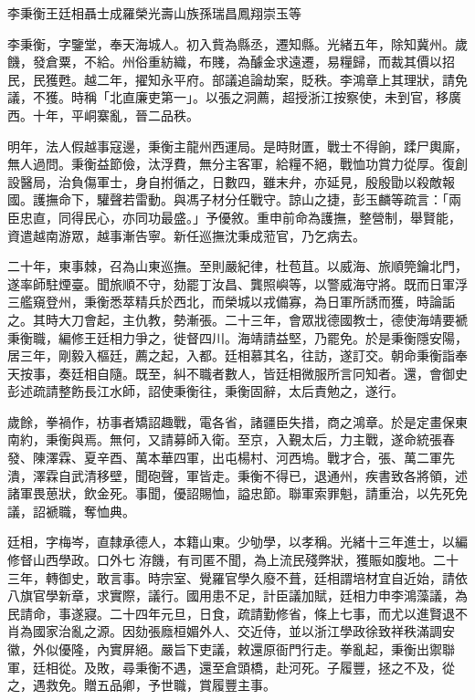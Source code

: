 
\begin{pinyinscope}
李秉衡王廷相聶士成羅榮光壽山族孫瑞昌鳳翔崇玉等

李秉衡，字鑒堂，奉天海城人。初入貲為縣丞，遷知縣。光緒五年，除知冀州。歲饑，發倉粟，不給。州俗重紡織，布賤，為醵金求遠遷，易糧歸，而裁其價以招民，民獲甦。越二年，擢知永平府。部議追論劫案，貶秩。李鴻章上其理狀，請免議，不獲。時稱「北直廉吏第一」。以張之洞薦，超授浙江按察使，未到官，移廣西。十年，平峒寨亂，晉二品秩。

明年，法人假越事寇邊，秉衡主龍州西運局。是時財匱，戰士不得餉，蹂尸輿廝，無人過問。秉衡益節儉，汰浮費，無分主客軍，給糧不絕，戰恤功賞力從厚。復創設醫局，治負傷軍士，身自拊循之，日數四，雖末弁，亦延見，殷殷勖以殺敵報國。護撫命下，驩聲若雷動。與馮子材分任戰守。諒山之捷，彭玉麟等疏言：「兩臣忠直，同得民心，亦同功最盛。」予優敘。重申前命為護撫，整營制，舉賢能，資遣越南游眾，越事漸告寧。新任巡撫沈秉成蒞官，乃乞病去。

二十年，東事棘，召為山東巡撫。至則嚴紀律，杜苞苴。以威海、旅順筦鑰北門，遂率師駐煙臺。聞旅順不守，劾罷丁汝昌、龔照嶼等，以警威海守將。既而日軍浮三艦窺登州，秉衡悉萃精兵於西北，而榮城以戎備寡，為日軍所誘而獲，時論詬之。其時大刀會起，主仇教，勢漸張。二十三年，會眾戕德國教士，德使海靖要褫秉衡職，編修王廷相力爭之，徙督四川。海靖請益堅，乃罷免。於是秉衡隱安陽，居三年，剛毅入樞廷，薦之起，入都。廷相慕其名，往訪，遂訂交。朝命秉衡詣奉天按事，奏廷相自隨。既至，糾不職者數人，皆廷相微服所言冋知者。還，會御史彭述疏請整飭長江水師，詔使秉衡往，秉衡固辭，太后責勉之，遂行。

歲餘，拳禍作，枋事者矯詔趣戰，電各省，諸疆臣失措，商之鴻章。於是定畫保東南約，秉衡與焉。無何，又請募師入衛。至京，入覲太后，力主戰，遂命統張春發、陳澤霖、夏辛酉、萬本華四軍，出屯楊村、河西塢。戰才合，張、萬二軍先潰，澤霖自武清移壁，聞砲聲，軍皆走。秉衡不得已，退通州，疾書致各將領，述諸軍畏葸狀，飲金死。事聞，優詔賜恤，謚忠節。聯軍索罪魁，請重治，以先死免議，詔褫職，奪恤典。

廷相，字梅岑，直隸承德人，本籍山東。少劬學，以孝稱。光緒十三年進士，以編修督山西學政。口外七洊饑，有司匿不聞，為上流民殘弊狀，獲賑如腹地。二十三年，轉御史，敢言事。時宗室、覺羅官學久廢不葺，廷相謂培材宜自近始，請依八旗官學新章，求實際，議行。國用患不足，計臣議加賦，廷相力申李鴻藻議，為民請命，事遂寢。二十四年元旦，日食，疏請勤修省，條上七事，而尤以進賢退不肖為國家治亂之源。因劾張廕桓媚外人、交近侍，並以浙江學政徐致祥秩滿調安徽，外似優隆，內實屏絕。嚴旨下吏議，敕還原衙門行走。拳亂起，秉衡出禦聯軍，廷相從。及敗，尋秉衡不遇，還至倉頭橋，赴河死。子履豐，拯之不及，從之，遇救免。贈五品卿，予世職，賞履豐主事。


\end{pinyinscope}
